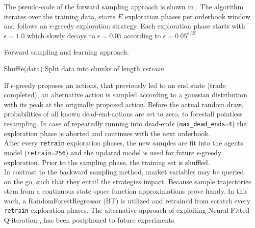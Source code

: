 The pseudo-code of the forward sampling approach is shown in . The algorithm iterates over the training data, starts $E$ exploration phases per orderbook window and follows an $\epsilon$-greedy exploration strategy. Each exploration phase starts with $\epsilon=1.0$ which slowly decays to $\epsilon=0.05$ according to $\epsilon=0.05^{e/E}$.\\

\begin{algorithm}[H] 
 \caption{Forward sampling and learning approach.}
     \SetAlgoLined
     \footnotesize
     

Shuffle(data)\;
Split data into chunks of length $retrain$


\label{alg:forward:pseudocode}
\end{algorithm}\bigskip

If $\epsilon$-greedy proposes an actions, that previously led to an end state (\ie trade completed), an alternative action is sampled according to a gaussian distribution with its peak at the originally proposed action. Before the actual random draw, probabilities of all known dead-end-actions are set to zero, to forestall pointless resampling. In case of repeatedly running into dead-ends (\eg \lstinline!max_dead_ends=4!) the exploration phase is aborted and continues with the next orderbook.\\

After every \lstinline!retrain! exploration phases, the new samples are fit into the agents model (\eg \lstinline!retrain=256!) and the updated model is used for future $\epsilon$-greedy exploration. Prior to the sampling phase, the training set is shuffled.\\

In contrast to the backward sampling method, market variables may be queried on the go, such that they entail the strategies impact. Because sample trajectories stem from a continuous state space function approximations prove handy. In this work, a RandomForestRegressor (\ie \ac{BT}) is utilized and retrained from scratch every \lstinline!retrain! exploration phases. The alternative approach of exploiting Neural Fitted Q-iteration \Cite{Riedmiller:2005:NFQ}, has been postphoned to future experiments.\\











\cleardoublepage{}